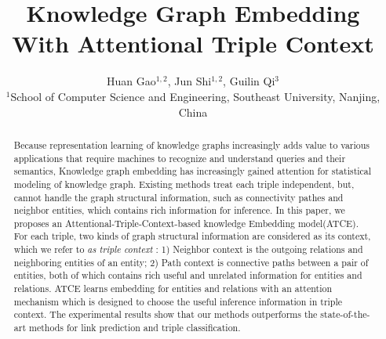 \documentclass{article}
\title{Knowledge Graph Embedding With Attentional Triple Context}
\author{Huan Gao$^{1,2}$, Jun Shi$^{1,2}$, Guilin Qi$^{3}$\\
$^{1}$School of Computer Science and Engineering,
Southeast University, Nanjing, China  \\
}
\begin{document}
\maketitle

\begin{abstract}
Because representation learning of knowledge graphs increasingly adds value to various applications that require machines to recognize and understand queries and their semantics, Knowledge graph embedding has increasingly gained attention for statistical modeling of knowledge graph. Existing methods treat each triple independent, but, cannot handle the graph structural information, such as connectivity pathes and neighbor entities, which contains rich information for inference. In this paper, we proposes an Attentional-Triple-Context-based knowledge Embedding model(ATCE). For each triple, two kinds of graph structural information are considered as its context, which we refer to \emph{as triple context} : 1) Neighbor context is the outgoing relations and neighboring entities of an entity; 2) Path context is connective paths between a pair of entities, both of which contains rich useful and unrelated information for entities and relations. ATCE learns embedding for entities and relations with an attention mechanism which is designed to choose the useful inference information in triple context. The experimental results show that our methods outperforms the state-of-the-art methods for link prediction and triple classification.
\end{abstract}













\end{document}
